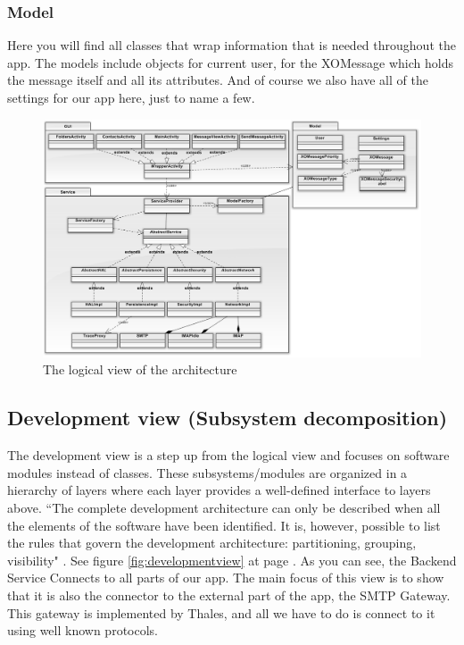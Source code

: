 \subsubsection{Model}
Here you will find all classes that wrap information that is needed throughout the app. The models include objects for current user, for the XOMessage which holds the message itself and all its attributes. And of course we also have all of the settings for our app here, just to name a few. 

\begin{figure}
	\includegraphics[width=\textwidth]{logicalview.png}
	\caption{The logical view of the architecture}
	\label{fig:logicalview}
\end{figure}

\subsection{Development view (Subsystem decomposition)}
The development view is a step up from the logical view and focuses on software modules instead of classes. These subsystems/modules are organized in a hierarchy of layers where each layer provides a well-defined interface to layers above. “The complete development architecture can only be described when all the elements of the software have been identified. It is, however, possible to list the rules that govern the development architecture: partitioning, grouping, visibility" \cite{bib:vm}. 
See figure \ref{fig:developmentview} at page \pageref{fig:developmentview}. As you can see, the Backend Service Connects to all parts of our app. The main focus of this view is to show that it is also the connector to the external part of the app, the SMTP Gateway. This gateway is implemented by Thales, and all we have to do is connect to it using well known protocols.

